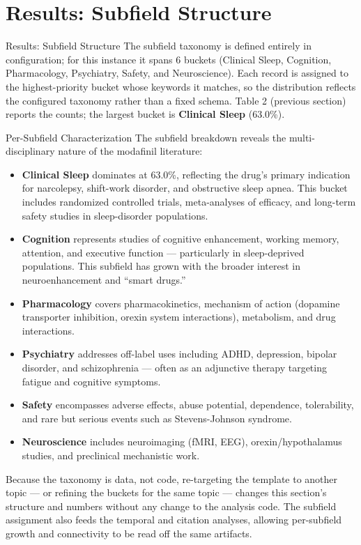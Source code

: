 \documentclass[
  ignorenonframetext,
]{beamer}
\author{\texorpdfstring{}{}}
\date{}
\begin{document}
\section{Results: Subfield Structure}\label{results-subfield-structure}

\begin{frame}[allowframebreaks]{Results: Subfield Structure}
The subfield taxonomy is defined entirely in configuration; for this
instance it spans 6 buckets (Clinical Sleep, Cognition, Pharmacology,
Psychiatry, Safety, and Neuroscience). Each record is assigned to the
highest-priority bucket whose keywords it matches, so the distribution
reflects the configured taxonomy rather than a fixed schema. Table 2
(previous section) reports the counts; the largest bucket is
\textbf{Clinical Sleep} (63.0\%).
\end{frame}

\begin{frame}[allowframebreaks]{Per-Subfield Characterization}
\protect{}\label{per-subfield-characterization}
The subfield breakdown reveals the multi-disciplinary nature of the
modafinil literature:

\begin{itemize}
\item
  \textbf{Clinical Sleep} dominates at 63.0\%, reflecting the drug's
  primary indication for narcolepsy, shift-work disorder, and
  obstructive sleep apnea. This bucket includes randomized controlled
  trials, meta-analyses of efficacy, and long-term safety studies in
  sleep-disorder populations.
\item
  \textbf{Cognition} represents studies of cognitive enhancement,
  working memory, attention, and executive function --- particularly in
  sleep-deprived populations. This subfield has grown with the broader
  interest in neuroenhancement and ``smart drugs.''
\item
  \textbf{Pharmacology} covers pharmacokinetics, mechanism of action
  (dopamine transporter inhibition, orexin system interactions),
  metabolism, and drug interactions.
\item
  \textbf{Psychiatry} addresses off-label uses including ADHD,
  depression, bipolar disorder, and schizophrenia --- often as an
  adjunctive therapy targeting fatigue and cognitive symptoms.
\item
  \textbf{Safety} encompasses adverse effects, abuse potential,
  dependence, tolerability, and rare but serious events such as
  Stevens-Johnson syndrome.
\item
  \textbf{Neuroscience} includes neuroimaging (fMRI, EEG),
  orexin/hypothalamus studies, and preclinical mechanistic work.
\end{itemize}

Because the taxonomy is data, not code, re-targeting the template to
another topic --- or refining the buckets for the same topic --- changes
this section's structure and numbers without any change to the analysis
code. The subfield assignment also feeds the temporal and citation
analyses, allowing per-subfield growth and connectivity to be read off
the same artifacts.
\end{frame}
\end{document}
